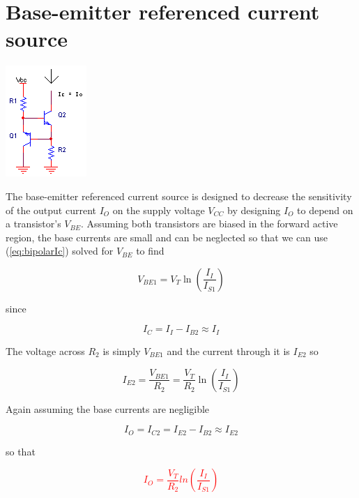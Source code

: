 \section{Base-emitter referenced current source}
\begin{center}
	\includegraphics{schematics/base-emitter_referenced_currentsource.PNG}
\end{center}
The base-emitter referenced current source is designed to decrease the sensitivity of the output current $I_{O}$ on the supply voltage $V_{CC}$ by designing $I_{O}$ to depend on a transistor's $V_{BE}$.
Assuming both transistors are biased in the forward active region, the base currents are small and can be neglected so that we can use (\ref{eq:bipolarIc}) solved for $V_{BE}$ to find

\begin{equation}
V_{BE1} = V_{T}\ln\left(\frac{I_{I}}{I_{S1}}\right)
\end{equation}

since

\begin{equation}
I_{C} = I_{I} - I_{B2} \approx I_{I}
\end{equation}

The voltage across $R_2$ is simply $V_{BE1}$ and the current through it is $I_{E2}$ so

\begin{equation}
I_{E2} = \frac{V_{BE1}}{R_2} = \frac{V_{T}}{R_2}\ln\left(\frac{I_{I}}{I_{S1}}\right)
\end{equation}

Again assuming the base currents are negligible

\begin{equation}
I_{O} = I_{C2} = I_{E2} - I_{B2} \approx I_{E2}
\end{equation}

so that

\textcolor{red}{
\begin{equation}
I_{O} = \frac{V_{T}}{R_{2}}ln(\frac{I_{I}}{I_{S1}})
\label{eq:Vbe_reference_current_source}
\end{equation}
}

